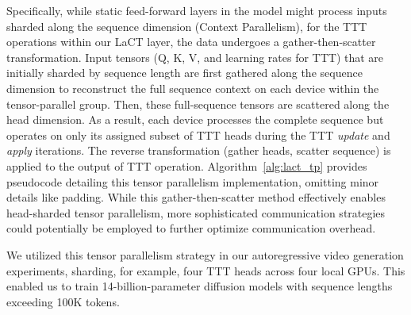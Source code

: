 \documentclass{article}
\begin{document}
Specifically, while static feed-forward layers in the model might process inputs sharded along the sequence dimension (Context Parallelism), for the TTT operations within our LaCT layer, the data undergoes a gather-then-scatter transformation. Input tensors (Q, K, V, and learning rates for TTT) that are initially sharded by sequence length are first gathered along the sequence dimension to reconstruct the full sequence context on each device within the tensor-parallel group. Then, these full-sequence tensors are scattered along the head dimension. As a result, each device processes the complete sequence but operates on only its assigned subset of TTT heads during the TTT \textit{update} and \textit{apply} iterations. The reverse transformation (gather heads, scatter sequence) is applied to the output of TTT operation. Algorithm~\ref{alg:lact_tp} provides pseudocode detailing this tensor parallelism implementation, omitting minor details like padding. While this gather-then-scatter method effectively enables head-sharded tensor parallelism, more sophisticated communication strategies~\cite{fang2024usp, jacobs2023deepspeed} could potentially be employed to further optimize communication overhead. 

We utilized this tensor parallelism strategy in our autoregressive video generation experiments, sharding, for example, four TTT heads across four local GPUs. This enabled us to train 14-billion-parameter diffusion models with sequence lengths exceeding 100K tokens.
\end{document}
